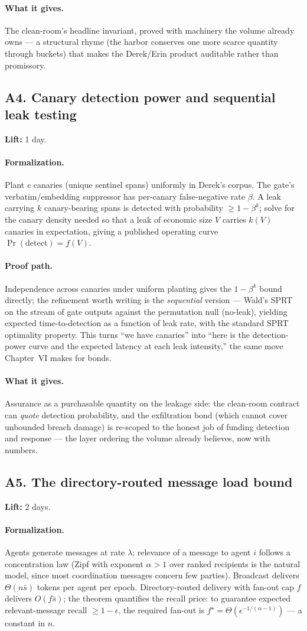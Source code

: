 \documentclass[11pt,a4paper]{article}
\newcommand{\lift}[1]{\noindent\textbf{Lift:} #1.}
\newcommand{\gives}{\paragraph{What it gives.}}
\newcommand{\form}{\paragraph{Formalization.}}
\newcommand{\proofpath}{\paragraph{Proof path.}}
\begin{document}
\gives The clean-room's headline invariant, proved with machinery the volume already owns --- a structural rhyme (the harbor conserves one more scarce quantity through buckets) that makes the Derek/Erin product auditable rather than promissory.

\subsection{A4. Canary detection power and sequential leak testing}
\lift{1 day}

\form Plant $c$ canaries (unique sentinel spans) uniformly in Derek's corpus. The gate's verbatim/embedding suppressor has per-canary false-negative rate $\beta$. A leak carrying $k$ canary-bearing spans is detected with probability $\ge 1 - \beta^k$; solve for the canary density needed so that a leak of economic size $V$ carries $k(V)$ canaries in expectation, giving a published operating curve $\Pr(\text{detect}) = f(V)$.

\proofpath Independence across canaries under uniform planting gives the $1-\beta^k$ bound directly; the refinement worth writing is the \emph{sequential} version --- Wald's SPRT on the stream of gate outputs against the permutation null (no-leak), yielding expected time-to-detection as a function of leak rate, with the standard SPRT optimality property. This turns ``we have canaries'' into ``here is the detection-power curve and the expected latency at each leak intensity,'' the same move Chapter~VI makes for bonds.

\gives Assurance as a purchasable quantity on the leakage side: the clean-room contract can \emph{quote} detection probability, and the exfiltration bond (which cannot cover unbounded breach damage) is re-scoped to the honest job of funding detection and response --- the layer ordering the volume already believes, now with numbers.

\subsection{A5. The directory-routed message load bound}
\lift{2 days}

\form Agents generate messages at rate $\lambda$; relevance of a message to agent $i$ follows a concentration law (Zipf with exponent $\alpha > 1$ over ranked recipients is the natural model, since most coordination messages concern few parties). Broadcast delivers $\Theta(n\bar{s})$ tokens per agent per epoch. Directory-routed delivery with fan-out cap $f$ delivers $O(f\bar{s})$; the theorem quantifies the recall price: to guarantee expected relevant-message recall $\ge 1-\epsilon$, the required fan-out is $f^\star = \Theta(\epsilon^{-1/(\alpha-1)})$ --- a constant in $n$.
\end{document}
